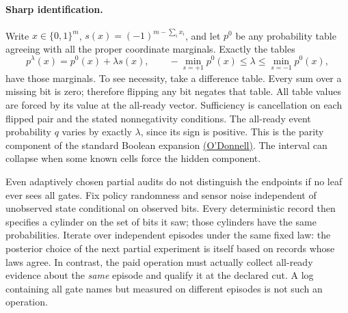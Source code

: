 \documentclass[11pt]{article}
\begin{document}
\paragraph{Sharp identification.}
Write \(x\in\{0,1\}^m\), \(s(x)=(-1)^{m-\sum_i x_i}\), and let \(p^0\) be any probability table agreeing with all the proper coordinate marginals. Exactly the tables
\[
 p^\lambda(x)=p^0(x)+\lambda s(x),\qquad
 -\min_{s=+1}p^0(x)\leq\lambda\leq\min_{s=-1}p^0(x),
\]
have those marginals. To see necessity, take a difference table. Every sum over a missing bit is zero; therefore flipping any bit negates that table. All table values are forced by its value at the all-ready vector. Sufficiency is cancellation on each flipped pair and the stated nonnegativity conditions. The all-ready event probability \(q\) varies by exactly \(\lambda\), since its sign is positive. This is the parity component of the standard Boolean expansion
\href{https://arxiv.org/abs/2105.10386}{(O'Donnell)}. The interval can collapse when some known cells force the hidden component.
\par
Even adaptively chosen partial audits do not distinguish the endpoints if no leaf ever sees all gates. Fix policy randomness and sensor noise independent of unobserved state conditional on observed bits. Every deterministic record then specifies a cylinder on the set of bits it saw; those cylinders have the same probabilities. Iterate over independent episodes under the same fixed law: the posterior choice of the next partial experiment is itself based on records whose laws agree. In contrast, the paid operation must actually collect all-ready evidence about the \emph{same} episode and qualify it at the declared cut. A log containing all gate names but measured on different episodes is not such an operation.
\end{document}
